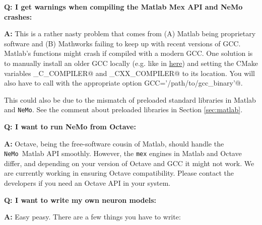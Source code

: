 \documentclass[a4paper]{article}
\newcommand{\nemo}{\texttt{NeMo}\xspace}
\newcommand{\command}[1]{\texttt{#1}}
\begin{document}
\vspace{5pt}
\textbf{Q: I get warnings when compiling the Matlab Mex API and NeMo crashes:}

\textbf{A:} This is a rather nasty problem that comes from (A) Matlab being
proprietary software and (B) Mathworks failing to keep up with recent versions
of GCC. Matlab's \verb@mex@ functions might crash if compiled with a modern
GCC. One solution is to manually install an older GCC locally (e.g. like in
\href{https://gcc.gnu.org/wiki/InstallingGCC}{here}) and setting the CMake
variables \verb@CMAKE_C_COMPILER@ and \verb@CMAKE_CXX_COMPILER@ to its
location. You will also have to call \verb@mex@ with the appropriate option
\verb@mex GCC='/path/to/gcc_binary'@.

This could also be due to the mismatch of preloaded standard libraries in
Matlab and \nemo. See the comment about preloaded libraries in Section
\ref{sec:matlab}.

\vspace{5pt}
\textbf{Q: I want to run NeMo from Octave:}

\textbf{A:} Octave, being the free-software cousin of Matlab, should handle the
\nemo\ Matlab API smoothly. However, the \command{mex} engines in Matlab and
Octave differ, and depending on your version of Octave and GCC it might not
work. We are currently working in ensuring Octave compatibility. Please contact
the developers if you need an Octave API in your system.

\vspace{5pt}
\textbf{Q: I want to write my own neuron models:}

\textbf{A:} Easy peasy. There are a few things you have to write:
\end{document}
